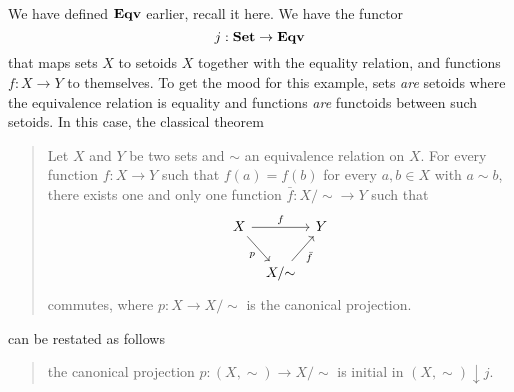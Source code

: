 \begin{example}
We have defined \(\mathbf{Eqv}\) earlier, recall it here. We have the functor
\[j : \mathbf{Set} \to \mathbf{Eqv}\]
that maps sets \(X\) to setoids \(X\) together with the equality relation, and functions \(f : X \to Y\) to themselves. To get the mood for this example, sets {\em are} setoids where the equivalence relation is equality and functions {\em are} functoids between such setoids. In this case, the classical theorem
\begin{quotation}
Let \(X\) and \(Y\) be two sets and \(\sim\) an equivalence relation on \(X\). For every function \(f : X \to Y\) such that \(f(a) = f(b)\) for every \(a, b \in X\) with \(a \sim b\), there exists one and only one function \(\bar f : X{/}{\sim} \to Y\) such that
\[\begin{tikzcd}[column sep=tiny]
X \ar["f", rr] \ar["p", swap, dr] & & Y \\
& X{/}{\sim} \ar["{\bar f}", swap, ur]
\end{tikzcd}\]
commutes, where \(p : X \to X{/}{\sim}\) is the canonical projection.
\end{quotation}
can be restated as follows
\begin{quotation}
the canonical projection \(p : (X, \sim) \to X{/}{\sim}\) is initial in \((X, \sim) \downarrow j\).
\end{quotation}
\end{example}

